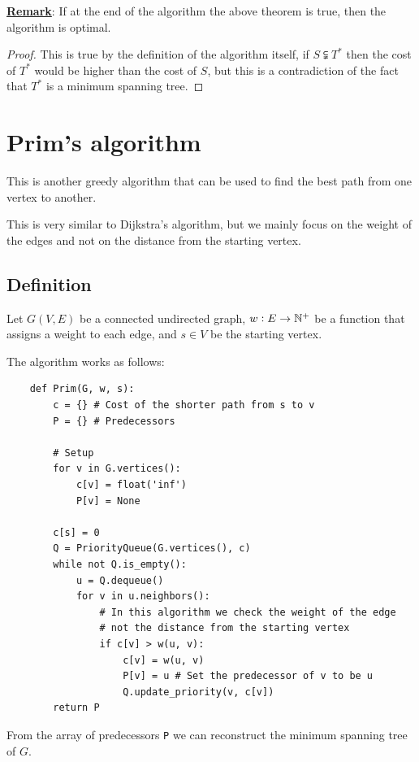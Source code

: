 \documentclass[12pt]{extarticle}
\begin{document}
\textbf{\underline{Remark}}: If at the end of the algorithm the above theorem is true, then the algorithm is optimal.

\begin{proof}
    This is true by the definition of the algorithm itself, if $S \subsetneqq T^*$ then the cost of $T^*$ would be higher than the cost of $S$, but this is a contradiction of the fact that $T^*$ is a minimum spanning tree.
\end{proof}

\section{Prim's algorithm}

This is another greedy algorithm that can be used to find the best path from one vertex to another.

This is very similar to Dijkstra's algorithm, but we mainly focus on the weight of the edges and not on the distance from the starting vertex.

\subsection{Definition}

Let $G(V, E)$ be a connected undirected graph, $w: E \to \mathbb{N}^+$ be a function that assigns a weight to each edge, and $s \in V$ be the starting vertex.

The algorithm works as follows:

\begin{verbatim}
    def Prim(G, w, s):
        c = {} # Cost of the shorter path from s to v
        P = {} # Predecessors

        # Setup
        for v in G.vertices():
            c[v] = float('inf')
            P[v] = None
        
        c[s] = 0
        Q = PriorityQueue(G.vertices(), c)
        while not Q.is_empty():
            u = Q.dequeue()
            for v in u.neighbors():
                # In this algorithm we check the weight of the edge
                # not the distance from the starting vertex
                if c[v] > w(u, v):
                    c[v] = w(u, v)
                    P[v] = u # Set the predecessor of v to be u
                    Q.update_priority(v, c[v])
        return P
\end{verbatim}

From the array of predecessors \texttt{P} we can reconstruct the minimum spanning tree of $G$.
\end{document}
